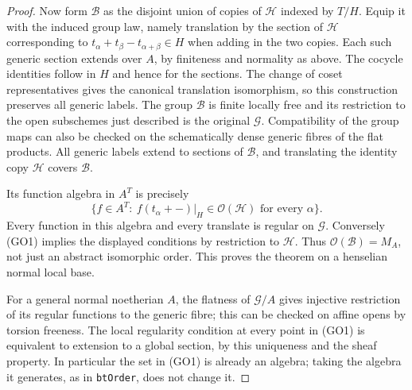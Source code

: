 \begin{proof}
Now form \(\mathscr B\) as the disjoint union of copies of
\(\mathscr H\) indexed by \(T/H\). Equip it with the
induced group law, namely translation by the section of
\(\mathscr H\) corresponding to
\(t_\alpha+t_\beta-t_{\alpha+\beta}\in H\) when adding in
the two copies. Each such generic section extends over
\(A\), by finiteness and normality as above. The cocycle
identities follow in \(H\) and hence for the sections.
The change of coset representatives gives the canonical
translation isomorphism, so this construction preserves all
generic labels. The group \(\mathscr B\) is finite locally
free and its restriction to the open subschemes just
described is the original \(\mathscr G\). Compatibility of
the group maps can also be checked on the schematically
dense generic fibres of the flat products. All generic
labels extend to sections of \(\mathscr B\), and translating
the identity copy \(\mathscr H\) covers \(\mathscr B\).

Its function algebra in \(A^T\) is precisely
\[
             \{f\in A^T:\ f(t_\alpha+{-})|_H
                              \in\mathcal O(\mathscr H)
                               \text{ for every }\alpha\}.
\]
Every function in this algebra and every translate is
regular on \(\mathscr G\). Conversely (GO1) implies the
displayed conditions by restriction to \(\mathscr H\).
Thus \(\mathcal O(\mathscr B)=M_A\), not just an abstract
isomorphic order. This proves the theorem on a henselian
normal local base.

For a general normal noetherian \(A\), the flatness of
\(\mathscr G/A\) gives injective restriction of its regular
functions to the generic fibre; this can be checked on
affine opens by torsion freeness. The local regularity
condition at every point in (GO1) is equivalent to extension
to a global section, by this uniqueness and the sheaf
property. In particular the set in (GO1) is already an
algebra; taking the algebra it generates, as in
\texttt{btOrder}, does not change it.


\end{proof}
